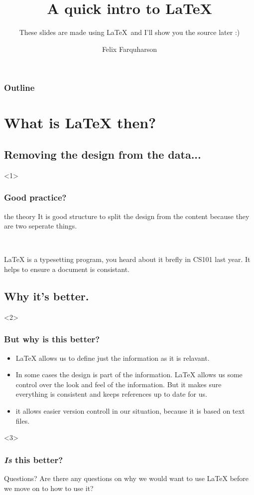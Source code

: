 \documentclass{beamer}
\title{A quick intro to \LaTeX}
\subtitle{These slides are made using \LaTeX\
		and I'll show you the source later :)}
\author{Felix Farquharson}
\institute{Group Project\\ CS2SOMETHING}
\begin{document}
\begin{frame}
  \titlepage
\end{frame}

\begin{frame}
  \frametitle{Outline}
  \tableofcontents
\end{frame}

\section{What is \LaTeX{} then?}
\subsection{Removing the design from the data...}

\begin{frame}<1>
  \frametitle{Good practice?}

  \begin{block}{the theory}
    It is good structure to split the design from the content because they 
	are two seperate things.
  \end{block}

\
\

\LaTeX{} is a typesetting program, you heard about it brefly in CS101
last year. It helps to ensure a document is consistant.

\end{frame}

\subsection{Why it's better.}

\begin{frame}<2>
\frametitle{But why is this better?}

\begin{itemize}
\item \LaTeX{} allows us to define just the information as it is relavant.
\item In some cases the design is part of the information. \LaTeX{}
allows us some control over the look and feel of the information.
But it makes sure everything is consistent and keeps references
up to date for us.
\item it allows easier version controll in our situation,
because it is based on text files.
\end{itemize}
\end{frame}

\begin{frame}<3>
\frametitle{\emph{Is} this better?}

\begin{block}{Questions?}
Are there any questions on why we would want to use \LaTeX{} before we
move on to how to use it?
\end{block}
\end{frame}
\end{document}
